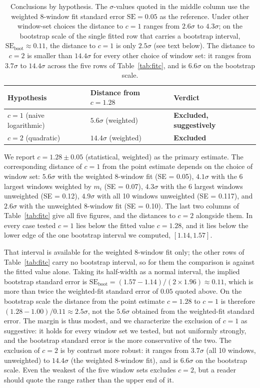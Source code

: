 \documentclass[11pt]{article}
\begin{document}
\begin{table}[H]\centering
\caption{Conclusions by hypothesis. The $\sigma$-values quoted in the
middle column use the weighted 8-window fit standard error $\mathrm{SE}
= 0.05$ as the reference. Under other window-set choices the distance
to $c = 1$ ranges from $2.6\sigma$ to $4.3\sigma$; on the bootstrap
scale of the single fitted row that carries a bootstrap interval,
$\mathrm{SE}_{\text{boot}} \approx 0.11$, the distance to $c = 1$ is
only $2.5\sigma$ (see text below). The distance to $c = 2$ is smaller
than $14.4\sigma$ for every other choice of window set: it ranges from
$3.7\sigma$ to $14.4\sigma$ across the five rows of
Table~\ref{tab:fitc}, and is $6.6\sigma$ on the bootstrap scale.}
\label{tab:robust}
\begin{tabular}{lll}
\toprule
Hypothesis & Distance from $c = 1.28$ & Verdict \\
\midrule
$c = 1$ (naive logarithmic) & $5.6\sigma$ (weighted)  & \textbf{Excluded, suggestively} \\
$c = 2$ (quadratic)         & $14.4\sigma$ (weighted) & \textbf{Excluded} \\
\bottomrule
\end{tabular}
\end{table}

We report $c = 1.28 \pm 0.05$ (statistical, weighted) as the primary
estimate. The corresponding distance of $c = 1$ from the point
estimate depends on the choice of window set: $5.6\sigma$ with the
weighted 8-window fit (SE = 0.05), $4.1\sigma$ with the 6 largest
windows weighted by $m_i$ (SE = 0.07), $4.3\sigma$ with the 6 largest
windows unweighted (SE = 0.12), $4.9\sigma$ with all 10 windows
unweighted (SE = 0.117), and $2.6\sigma$ with the unweighted 8-window
fit (SE = 0.10). The last two columns of Table~\ref{tab:fitc} give all
five figures, and the distances to $c = 2$ alongside them. In every case
tested $c = 1$ lies below the fitted value $c = 1.28$, and it lies
below the lower edge of the one bootstrap interval we computed,
$[1.14, 1.57]$.

That interval is available for the weighted 8-window fit only; the
other rows of Table~\ref{tab:fitc} carry no bootstrap interval, so for
them the comparison is against the fitted value alone. Taking its
half-width as a normal interval, the implied bootstrap standard error
is
$\mathrm{SE}_{\text{boot}} = (1.57 - 1.14)/(2 \times 1.96) \approx
0.11$, which is more than twice the weighted-fit standard error of
$0.05$ quoted above. On the bootstrap scale the distance from the point
estimate $c = 1.28$ to $c = 1$ is therefore
$(1.28 - 1.00)/0.11 \approx 2.5\sigma$, not the $5.6\sigma$ obtained
from the weighted-fit standard error. The margin is thus modest, and we
characterize the exclusion of $c = 1$ as suggestive: it holds for every
window set we tested, but not uniformly strongly, and the bootstrap
standard error is the more conservative of the two. The exclusion of
$c = 2$ is by contrast more robust: it ranges from $3.7\sigma$ (all
10 windows, unweighted) to $14.4\sigma$ (the weighted 8-window fit), and
is $6.6\sigma$ on the bootstrap scale. Even the weakest of the five
window sets excludes $c = 2$, but a reader should quote the range rather
than the upper end of it.
\end{document}
